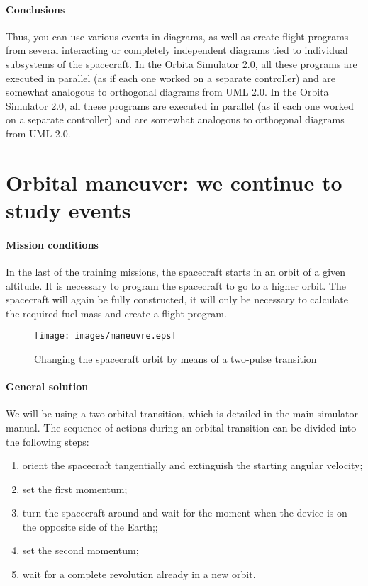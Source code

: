 \documentclass[12pt,a4paper]{article}
\begin{document}
\paragraph{Conclusions} Thus, you can use various events in diagrams, as well as create flight programs from several interacting or completely independent diagrams tied to individual subsystems of the spacecraft. In the Orbita Simulator 2.0, all these programs are executed in parallel (as if each one worked on a separate controller) and are somewhat analogous to orthogonal diagrams from UML 2.0. In the Orbita Simulator 2.0, all these programs are executed in parallel (as if each one worked on a separate controller) and are somewhat analogous to orthogonal diagrams from UML 2.0.

\clearpage
\section{Orbital maneuver: we continue to study events}

\paragraph{Mission conditions} In the last of the training missions, the spacecraft starts in an orbit of a given altitude. It is necessary to program the spacecraft to go to a higher orbit. The spacecraft will again be fully constructed, it will only be necessary to calculate the required fuel mass and create a flight program.

\begin{figure}[tbh]
  \begin{center}
    \texttt{[image: images/maneuvre.eps]}
    \caption{Changing the spacecraft orbit by means of a two-pulse transition}
    \label{Pic:Maneuvre}
  \end{center}
\end{figure}

\paragraph{General solution} We will be using a two orbital transition, which is detailed in the main simulator manual. The sequence of actions during an orbital transition can be divided into the following steps:

\begin{enumerate}
\item orient the spacecraft tangentially and extinguish the starting angular velocity;
\item set the first momentum;
\item turn the spacecraft around and wait for the moment when the device is on the opposite side of the Earth;;
\item set the second momentum;
\item wait for a complete revolution already in a new orbit.
\end{enumerate}
\end{document}
